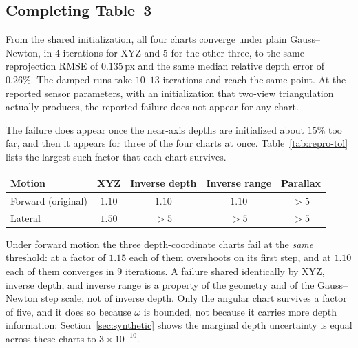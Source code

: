 \documentclass[11pt,a4paper]{article}
\theoremstyle{definition}
\theoremstyle{remark}
\begin{document}
\subsection{Completing Table~3}
From the shared initialization, all four charts converge under plain Gauss--Newton, in $4$ iterations for XYZ and $5$ for the other three, to the same reprojection RMSE of $0.135$\,px and the same median relative depth error of $0.26\%$. The damped runs take $10$--$13$ iterations and reach the same point. At the reported sensor parameters, with an initialization that two-view triangulation actually produces, the reported failure does not appear for any chart.

The failure does appear once the near-axis depths are initialized about $15\%$ too far, and then it appears for three of the four charts at once. Table~\ref{tab:repro-tol} lists the largest such factor that each chart survives.

{\setlength{\topsep}{0pt}\setlength{\partopsep}{0pt}%
\setlength{\abovecaptionskip}{4pt}%
\begin{center}
\label{tab:repro-tol}
\small
\begin{tabular}{lcccc}
\toprule
Motion & XYZ & Inverse depth & Inverse range & Parallax\\
\midrule
Forward (original) & $1.10$ & $1.10$ & $1.10$ & $>5$\\
Lateral & $1.50$ & $>5$ & $>5$ & $>5$\\
\bottomrule
\end{tabular}
\end{center}}

Under forward motion the three depth-coordinate charts fail at the \emph{same} threshold: at a factor of $1.15$ each of them overshoots on its first step, and at $1.10$ each of them converges in $9$ iterations. A failure shared identically by XYZ, inverse depth, and inverse range is a property of the geometry and of the Gauss--Newton step scale, not of inverse depth. Only the angular chart survives a factor of five, and it does so because $\omega$ is bounded, not because it carries more depth information: Section~\ref{sec:synthetic} shows the marginal depth uncertainty is equal across these charts to $3\times10^{-10}$.
\end{document}
